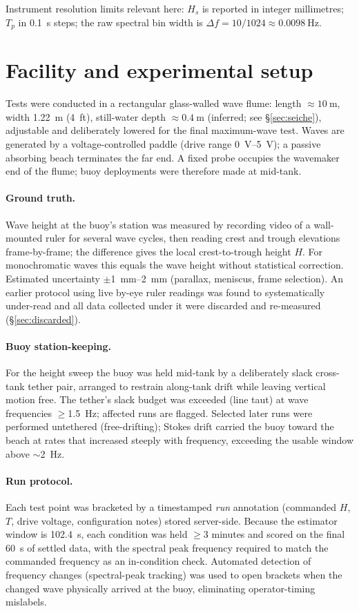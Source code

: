 \documentclass[11pt,a4paper]{article}
\begin{document}
Instrument resolution limits relevant here: $H_s$ is reported in integer
millimetres; $T_p$ in \SI{0.1}{\second} steps; the raw spectral bin width is
$\Delta f = 10/1024 \approx \SI{0.0098}{\hertz}$.

\section{Facility and experimental setup}
\label{sec:facility}
Tests were conducted in a rectangular glass-walled wave flume:
length $\approx \SI{10}{\meter}$, width \SI{1.22}{\meter} (\SI{4}{ft}),
still-water depth $\approx \SI{0.4}{\meter}$ (inferred; see
\S\ref{sec:seiche}), adjustable and deliberately lowered for the final
maximum-wave test. Waves are generated by a voltage-controlled paddle
(drive range \SIrange{0}{5}{\volt}); a passive absorbing beach terminates
the far end. A fixed probe occupies the wavemaker end of the flume; buoy
deployments were therefore made at mid-tank.

\paragraph{Ground truth.} Wave height at the buoy's station was measured by
recording video of a wall-mounted ruler for several wave cycles, then reading
crest and trough elevations frame-by-frame; the difference gives the local
crest-to-trough height $H$. For monochromatic waves this equals the wave
height without statistical correction. Estimated uncertainty
$\pm$\SIrange{1}{2}{\milli\meter} (parallax, meniscus, frame selection). An
earlier protocol using live by-eye ruler readings was found to systematically
under-read and all data collected under it were discarded and re-measured
(\S\ref{sec:discarded}).

\paragraph{Buoy station-keeping.} For the height sweep the buoy was held
mid-tank by a deliberately slack cross-tank tether pair, arranged to restrain
along-tank drift while leaving vertical motion free. The tether's slack
budget was exceeded (line taut) at wave frequencies $\ge$\SI{1.5}{\hertz};
affected runs are flagged. Selected later runs were performed untethered
(free-drifting); Stokes drift carried the buoy toward the beach at rates that
increased steeply with frequency, exceeding the usable window above
$\sim$\SI{2}{\hertz}.

\paragraph{Run protocol.} Each test point was bracketed by a timestamped
\emph{run} annotation (commanded $H$, $T$, drive voltage, configuration
notes) stored server-side. Because the estimator window is
\SI{102.4}{\second}, each condition was held $\ge$3 minutes and scored on the
final \SI{60}{\second} of settled data, with the spectral peak frequency
required to match the commanded frequency as an in-condition check.
Automated detection of frequency changes (spectral-peak tracking) was used to
open brackets when the changed wave physically arrived at the buoy,
eliminating operator-timing mislabels.
\end{document}
